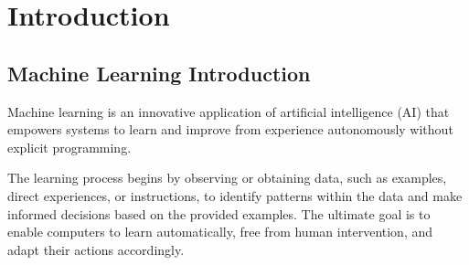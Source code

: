 \section{Introduction}
\subsection{Machine Learning Introduction}
Machine learning is an innovative application of artificial intelligence (AI) that empowers systems to learn and improve from experience autonomously without explicit programming. 

The learning process begins by observing or obtaining data, such as examples, direct experiences, or instructions, to identify patterns within the data and make informed decisions based on the provided examples. The ultimate goal is to enable computers to learn automatically, free from human intervention, and adapt their actions accordingly.

